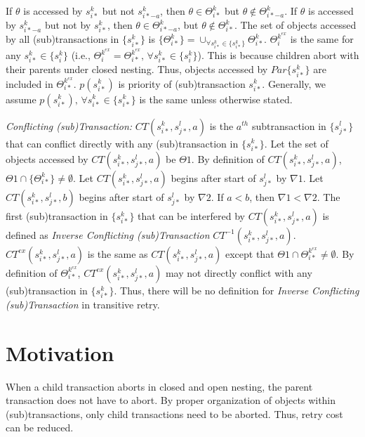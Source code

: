 \documentclass[10pt, conference, compsocconf]{IEEEtran}
\begin{document}
If $\theta$ is accessed by $s_{i*}^{k}$ but not $s_{i*-a}^{k}$,
then $\theta\in\Theta_{i*}^{k}$ but $\theta\not\in\Theta_{i*-a}^{k}$.
If $\theta$ is accessed by $s_{i*-a}^{k}$ but not by $s_{i*}^{k}$,
then $\theta\in\Theta_{i*-a}^{k}$, but $\theta\not\in\Theta_{i*}^{k}$.
The set of objects accessed by all (sub)transactions in $\{s_{i*}^{k}\}$
is $\{\Theta_{i*}^{k}\}=\cup_{\forall s_{i*}^{k}\in\{s_{i*}^{k}\}}\Theta_{i*}^{k}$. $\Theta_{i}^{k^{ex}}$
is the same for any $s_{i*}^{k}\in\{s_{i}^{k}\}$ (i.e., $\Theta_{i}^{k^{ex}}=\Theta_{i*}^{k^{ex}},\,\forall s_{i*}^{k}\in\{s_{i}^{k}\}$).
This is because children abort with their parents under closed nesting.
Thus, objects accessed by $Par\{s_{i*}^{k}\}$ are included in $\Theta_{i*}^{k^{ex}}$. $p(s_{i*}^{k})$ is priority of (sub)transaction $s_{i*}^{k}$. Generally,
we assume $p(s_{i*}^{k}),\,\forall s_{i*}^{k}\in\{s_{i*}^{k}\}$ is
the same unless otherwise stated.

\textit{Conflicting (sub)Transaction:} $CT(s_{i*}^{k},s_{j*}^{l},a)$
is the $a^{th}$ subtransaction in $\{s_{j*}^{l}\}$ that can conflict
directly with any (sub)transaction in $\{s_{i*}^{k}\}$. Let the set
of objects accessed by $CT(s_{i*}^{k},s_{j*}^{l},a)$ be $\Theta1$.
By definition of $CT(s_{i*}^{k},s_{j*}^{l},a)$, $\Theta1\cap\{\Theta_{i*}^{k}\}\neq\emptyset$.
Let $CT(s_{i*}^{k},s_{j*}^{l},a)$ begins after start of $s_{j*}^{l}$
by $\nabla1$. Let $CT(s_{i*}^{k},s_{j*}^{l},b)$ begins after start
of $s_{j*}^{l}$ by $\nabla2$. If $a<b$, then $\nabla1<\nabla2$.
The first (sub)transaction in $\{s_{i*}^{k}\}$ that can be interfered
by $CT(s_{i*}^{k},s_{j*}^{l},a)$ is defined as \textit{Inverse Conflicting
(sub)Transaction} $CT^{-1}(s_{i*}^{k},s_{j*}^{l},a)$. $CT^{ex}(s_{i*}^{k},s_{j*}^{l},a)$
is the same as $CT(s_{i*}^{k},s_{j*}^{l},a)$ except that $\Theta1\cap\Theta_{i*}^{k^{ex}}\neq\emptyset$.
By definition of $\Theta_{i*}^{k^{ex}}$, $CT^{ex}(s_{i*}^{k},s_{j*}^{l},a)$
may not directly conflict with any (sub)transaction in $\{s_{i*}^{k}\}$.
Thus, there will be no definition for \textit{Inverse Conflicting
(sub)Transaction} in transitive retry.


\section{Motivation}\label{sec:motivation}

When a child transaction aborts in closed and open nesting, the parent
transaction does not have to abort. By proper organization of objects
within (sub)transactions, only child transactions need to be aborted.
Thus, retry cost can be reduced.
\end{document}
